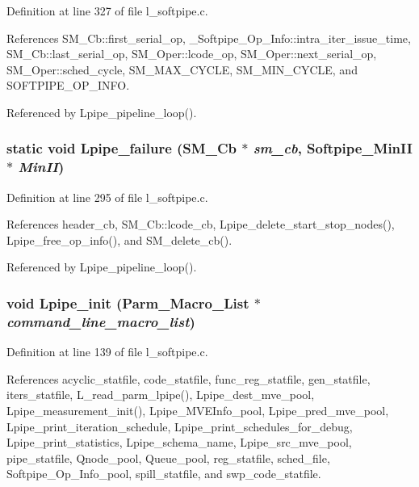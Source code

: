 Definition at line 327 of file l\_\-softpipe.c.

References SM\_\-Cb::first\_\-serial\_\-op, \_\-Softpipe\_\-Op\_\-Info::intra\_\-iter\_\-issue\_\-time, SM\_\-Cb::last\_\-serial\_\-op, SM\_\-Oper::lcode\_\-op, SM\_\-Oper::next\_\-serial\_\-op, SM\_\-Oper::sched\_\-cycle, SM\_\-MAX\_\-CYCLE, SM\_\-MIN\_\-CYCLE, and SOFTPIPE\_\-OP\_\-INFO.

Referenced by Lpipe\_\-pipeline\_\-loop().
\subsubsection{\setlength{\rightskip}{0pt plus 5cm}static void Lpipe\_\-failure (\bf{SM\_\-Cb} $\ast$ {\em sm\_\-cb}, Softpipe\_\-Min\-II $\ast$ {\em Min\-II})\hspace{0.3cm}{\tt  [static]}}\label{l__softpipe_8c_dc1a6d6920170c96e1c6d6d52eacf808}




Definition at line 295 of file l\_\-softpipe.c.

References header\_\-cb, SM\_\-Cb::lcode\_\-cb, Lpipe\_\-delete\_\-start\_\-stop\_\-nodes(), Lpipe\_\-free\_\-op\_\-info(), and SM\_\-delete\_\-cb().

Referenced by Lpipe\_\-pipeline\_\-loop().
\subsubsection{\setlength{\rightskip}{0pt plus 5cm}void Lpipe\_\-init (Parm\_\-Macro\_\-List $\ast$ {\em command\_\-line\_\-macro\_\-list})}\label{l__softpipe_8c_f044c0c24784b6dda4e45d4e5688ba4d}




Definition at line 139 of file l\_\-softpipe.c.

References acyclic\_\-statfile, code\_\-statfile, func\_\-reg\_\-statfile, gen\_\-statfile, iters\_\-statfile, L\_\-read\_\-parm\_\-lpipe(), Lpipe\_\-dest\_\-mve\_\-pool, Lpipe\_\-measurement\_\-init(), Lpipe\_\-MVEInfo\_\-pool, Lpipe\_\-pred\_\-mve\_\-pool, Lpipe\_\-print\_\-iteration\_\-schedule, Lpipe\_\-print\_\-schedules\_\-for\_\-debug, Lpipe\_\-print\_\-statistics, Lpipe\_\-schema\_\-name, Lpipe\_\-src\_\-mve\_\-pool, pipe\_\-statfile, Qnode\_\-pool, Queue\_\-pool, reg\_\-statfile, sched\_\-file, Softpipe\_\-Op\_\-Info\_\-pool, spill\_\-statfile, and swp\_\-code\_\-statfile.
